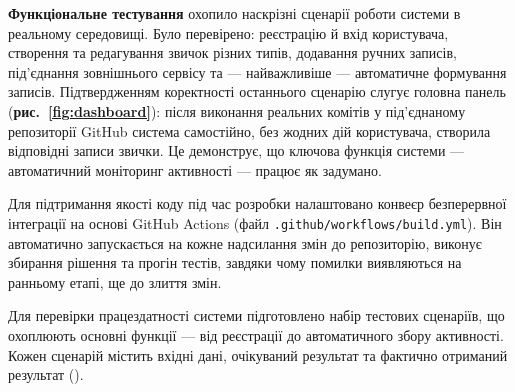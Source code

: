 \textbf{Функціональне тестування} охопило наскрізні сценарії роботи системи в реальному середовищі. Було перевірено: реєстрацію й вхід користувача, створення та редагування звичок різних типів, додавання ручних записів, під'єднання зовнішнього сервісу та — найважливіше — автоматичне формування записів. Підтвердженням коректності останнього сценарію слугує головна панель (\textbf{рис.~\ref{fig:dashboard}}): після виконання реальних комітів у під'єднаному репозиторії GitHub система самостійно, без жодних дій користувача, створила відповідні записи звички. Це демонструє, що ключова функція системи — автоматичний моніторинг активності — працює як задумано.

Для підтримання якості коду під час розробки налаштовано конвеєр безперервної інтеграції на основі GitHub Actions (файл \texttt{.github/workflows/build.yml}). Він автоматично запускається на кожне надсилання змін до репозиторію, виконує збирання рішення та прогін тестів, завдяки чому помилки виявляються на ранньому етапі, ще до злиття змін.


Для перевірки працездатності системи підготовлено набір тестових сценаріїв, що охоплюють основні функції — від реєстрації до автоматичного збору активності. Кожен сценарій містить вхідні дані, очікуваний результат та фактично отриманий результат ().

